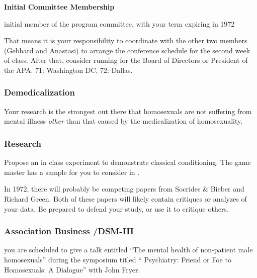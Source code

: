 \begin{refsection}
\textbf{Initial Committee Membership}
\begin{service}[Hooker]\label{service:hooker}
initial member of the program committee, with your term expiring in 1972
\end{service}

That means it is your responsibility to coordinate with the other two members (Gebhard and Anastasi) to arrange the conference schedule for the second week of class. After that, consider running for the Board of Directors or President of the APA. 71: Washington DC, 72: Dallas.

\subsubsection{Demedicalization}
\label{demedicalization}

Your research is the strongest out there that homosexuals are not suffering from mental illness \emph{other} than that caused by the medicalization of homosexuality.

\subsubsection{Research}
\label{research}

\begin{researchtask}[Hooker]\label{researchtask:hooker}Propose an in class experiment to demonstrate classical conditioning. The game master has a sample for you to consider in .\end{researchtask}

In 1972, there will probably be competing papers from Socrides \& Bieber and Richard Green. Both of these papers will likely contain critiques or analyzes of your data. Be prepared to defend your study, or use it to critique others.

\subsubsection{Association Business \slash  DSM-III}
\label{associationbusinessdsm-iii}

\begin{writingtask}[Hooker]\label{writingtask:hooker}
you are scheduled to give a talk entitled “The mental health of non-patient male homosexuals” during the symposium titled “ Psychiatry: Friend or Foe to Homosexuals: A Dialogue” with John Fryer.
\end{writingtask}


\end{refsection}
